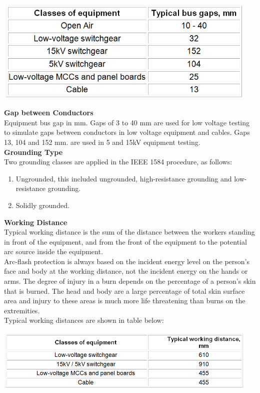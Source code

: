 \begin{center}
\includegraphics[width=5in, keepaspectratio=true]{../Images/Gaps.png} \\
\end{center}

\noindent\textbf{Gap between Conductors } \\  
\noindent Equipment bus gap in mm. Gaps of 3 to 40 mm are used for low voltage testing to simulate gaps between conductors in low voltage equipment and cables. Gaps 13, 104 and 152 mm. are used in 5 and 15kV equipment testing.\\
   
\noindent\textbf{Grounding Type}    \\
\noindent Two grounding classes are applied in the IEEE 1584 procedure, as follows:
\begin{enumerate}
	\item Ungrounded, this included ungrounded, high-resistance grounding and low-resistance grounding.
	\item Solidly grounded. 
\end{enumerate}

\noindent\textbf{Working Distance }  \\ 
\noindent Typical working distance is the sum of the distance between the workers standing in front of the equipment, and from the front of the equipment to the potential arc source inside the equipment. \\

\noindent Arc-flash protection is always based on the incident energy level on the person's face and body at the working distance, not the incident energy on the hands or arms. The degree of injury in a burn depends on the percentage of a person's skin that is burned. The head and body are a large percentage of total skin surface area and injury to these areas is much more life threatening than burns on the extremities. \\

\noindent Typical working distances are shown in table below:
\begin{center}
\includegraphics[width=5in, keepaspectratio=true]{../Images/WorkingDistance.png} \\
\end{center}

